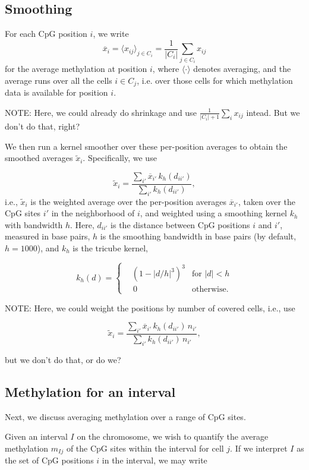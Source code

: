 \documentclass[twocolumn,10pt]{article}
\begin{document}
\subsection{Smoothing}

For each CpG position $i$, we write 
$$\overline{x}_i=\langle x_{ij} \rangle_{j\in C_i} = \frac{1}{|C_i|}\sum_{j\in C_i} x_{ij}$$ 
for the average methylation at position $i$, where $\langle\cdot\rangle$ denotes averaging, and the average runs over all the cells $i\in C_j$, i.e. over those cells for which methylation data is available for position $i$.

NOTE: Here, we could already do shrinkage and use $\frac{1}{|C_i|+1}\sum_i x_{ij}$ intead. But we don't do that, right?

We then run a kernel smoother over these per-position averages to obtain the smoothed averages $\tilde x_i$. Specifically, we use

\[ \tilde x_i = \frac{\sum_{i'} \overline x_{i'}\, k_h(d_{ii'})}{\sum_{i'} k_h(d_{ii'})},\]
i.e., $\tilde x_i$ is the weighted average over the per-position averages $\overline{x}_{i'}$, taken over the CpG sites $i'$ in the neighborhood of $i$, and weighted using a smoothing kernel $k_h$ with bandwidth $h$. Here, $d_{ii'}$ is the distance between CpG positions $i$ and $i'$, measured in base pairs, $h$ is the smoothing bandwidth in base pairs (by default, $h=1000$), and $k_h$ is the tricube kernel,

\[ k_h(d) = \left\{
\begin{aligned}
	&\left(1-|d/h|^3\right)^3 &\text{for } |d|<h \\
	&\,0 &\text{otherwise}. 
\end{aligned}
\right.
\]

NOTE: Here, we could weight the positions by number of covered cells, i.e., use

$$ \tilde x_i = \frac{\sum_{i'} \overline x_{i'}\, k_h(d_{ii'})\, n_{i'}}{\sum_{i'} k_h(d_{ii'})\, n_{i'}},$$

but we don't do that, or do we?


\subsection{Methylation for an interval}

Next, we discuss averaging methylation over a range of CpG sites.

Given an interval $I$ on the chromosome, we wish to quantify the average methylation $m_{Ij}$ of the CpG sites within the interval for cell $j$. If we interpret $I$ as the set of CpG positions $i$ in the interval, we may write
\end{document}
